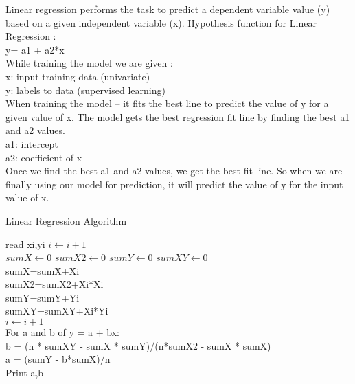 \documentclass[runningheads]{llncs}
\begin{document}
Linear regression performs the task to predict a dependent variable value (y) based on a given independent variable (x).
Hypothesis function for Linear Regression :\\
y= a1 + a2*x\\
While training the model we are given :\\
x: input training data (univariate)\\
y: labels to data (supervised learning)\\
When training the model – it fits the best line to predict the value of y for a given value of x. The model gets the best regression fit line by finding the best a1 and a2 values.\\
a1: intercept\\
a2: coefficient of x\\
Once we find the best a1 and a2 values, we get the best fit line. So when we are finally using our model for prediction, it will predict the value of y for the input value of x.
\begin{algorithm}[H] %
\caption{Linear Regression Algorithm} %
\label{algo1}
\begin{algorithmic}
read xi,yi
$i\gets i+1$
\EndFor\\
$sumX\gets 0$
$sumX2\gets 0$
$sumY\gets 0$
$sumXY\gets 0$
\\
sumX=sumX+Xi\\
sumX2=sumX2+Xi*Xi\\
sumY=sumY+Yi\\
sumXY=sumXY+Xi*Yi\\
$i\gets i+1$
\EndFor\\
For a and b of y = a + bx:\\
b = (n * sumXY - sumX * sumY)/(n*sumX2 - sumX * sumX)\\
a = (sumY - b*sumX)/n\\
Print a,b
\EndProcedure
\end{algorithmic}
\end{algorithm}
%
\end{document}
